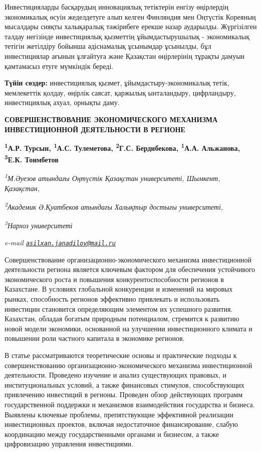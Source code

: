 Инвестицияларды басқарудың инновациялық тетіктерін енгізу өңірлердің
экономикалық өсуін жеделдетуге алып келген Финляндия мен Оңтүстік
Кореяның мысалдары сияқты халықаралық тәжірибеге ерекше назар аударылды.
Жүргізілген талдау негізінде инвестициялық қызметтің
ұйымдастырушылық - экономикалық тетігін жетілдіру бойынша әдіснамалық
ұсынымдар ұсынылды, бұл инвестициялар ағынын ұлғайтуға және Қазақстан
өңірлерінің тұрақты дамуын қамтамасыз етуге мүмкіндік береді.

{\bfseries Түйін сөздер:} инвестициялық қызмет, ұйымдастыру-экономикалық
тетік, мемлекеттік қолдау, өңірлік саясат, қаржылық ынталандыру,
цифрландыру, инвестициялық ахуал, орнықты даму.

\begin{articleheader}
{\bfseries СОВЕРШЕНСТВОВАНИЕ ЭКОНОМИЧЕСКОГО МЕХАНИЗМА ИНВЕСТИЦИОННОЙ ДЕЯТЕЛЬНОСТИ В РЕГИОНЕ}

{\bfseries
\textsuperscript{1}А.Р. Турсын\textsuperscript{\envelope },
\textsuperscript{1}А.С. Тулеметова,
\textsuperscript{2}Г.С. Бердибекова,
\textsuperscript{1}А.А. Альжанова,
\textsuperscript{3}Е.К. Тоимбетов}
\end{articleheader}

\begin{affiliation}
\emph{\textsuperscript{1}М.Әуезов атындағы Оңтүстік Қазақстан университеті, Шымкент, Қазақстан,}

\emph{\textsuperscript{2}Академик Ә.Қуатбеков атындағы Халықтыр достығы университеті,}

\emph{\textsuperscript{3}Нархоз университеті}

\emph{e-mail \href{mailto:asilxan.janadilov@mail.ru}{\nolinkurl{asilxan.janadilov@mail.ru}}}
\end{affiliation}

Совершенствование организационно-экономического механизма инвестиционной
деятельности региона является ключевым фактором для обеспечения
устойчивого экономического роста и повышения конкурентоспособности
регионов в Казахстане. В условиях глобальной конкуренции и изменений на
мировых рынках, способность регионов эффективно привлекать и
использовать инвестиции становится определяющим элементом их успешного
развития. Казахстан, обладая богатым природным потенциалом, стремится к
развитию новой модели экономики, основанной на улучшении инвестиционного
климата и повышении роли частного капитала в экономике регионов.

В статье рассматриваются теоретические основы и практические подходы к
совершенствованию организационно-экономического механизма инвестиционной
деятельности. Проведено изучение и анализ существующих правовых, и
институциональных условий, а также финансовых стимулов, способствующих
привлечению инвестиций в регионы. Проведен обзор действующих программ
государственной поддержки и механизмов взаимодействия государства и
бизнеса. Выявлены ключевые проблемы, препятствующие эффективной
реализации инвестиционных проектов, включая недостаточное
финансирование, слабую координацию между государственными органами и
бизнесом, а также цифровизацию управления инвестициями.

